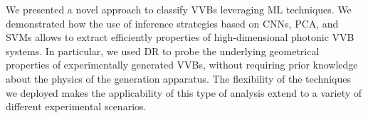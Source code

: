We presented a novel approach to classify \acp{VVB} leveraging ML techniques. We demonstrated how the use of inference strategies based on CNNs, PCA, and SVMs allows to extract efficiently properties of high-dimensional photonic \ac{VVB} systems.
In particular, we used DR to probe the underlying geometrical properties of experimentally generated VVBs, without requiring prior knowledge about the physics of the generation apparatus.
The flexibility of the techniques we deployed makes the applicability of this type of  analysis extend to a variety of different experimental scenarios.
